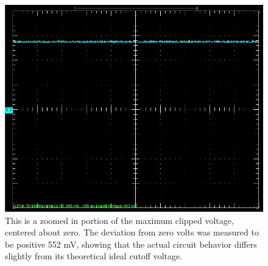 \documentclass[twocolumn,english]{IEEEtran}
\begin{document}
\begin{figure}[h]
  \begin{centering}
  \begin{center}
  \includegraphics[width=\linewidth]{./Cutoff_Voltage.png}
  \caption{This is a zoomed in portion of the maximum clipped voltage, centered about zero. The deviation from zero volts was measured to be positive 552 mV, showing that the actual circuit behavior differs slightly from its theoretical ideal cutoff voltage.}
  \label{fig:cutoff_voltage}
  \end{center}
  \par\end{centering}
  \end{figure}
\end{document}
